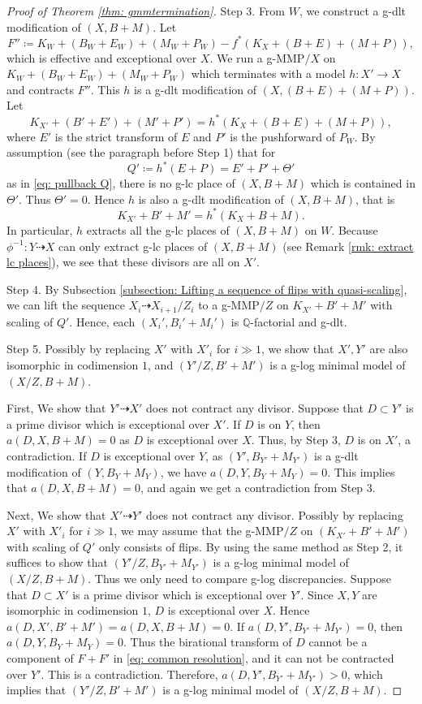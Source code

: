 \documentclass[11pt]{amsart}
\newcommand{\Qq}{\mathbb{Q}}
\begin{document}
\begin{proof}[Proof of Theorem \ref{thm: gmmtermination}]
Step 3. From $W$, we construct a g-dlt modification of $(X, B+M)$. Let
	\[
	F'' \coloneqq K_W+(B_W+E_W)+(M_W+P_W) -f^*(K_{X}+(B+E)+(M+P)),
	\] which is effective and exceptional over $X$. We run a g-MMP$/X$ on $K_W+(B_W+E_W)+(M_W+P_W)$ which terminates with a model $h: X' \to X$ and contracts $F''$. This $h$ is a g-dlt modification of $(X, (B+E)+(M+P))$. Let
	\[
	K_{X'}+(B'+E')+(M'+P') =h^*(K_{X}+(B+E)+(M+P)),
	\]  
	where $E'$ is the strict transform of $E$ and $P'$ is the pushforward of $P_W$. By assumption (see the paragraph before Step 1) that for 
	\[
	Q'\coloneqq h^*(E+P)=E'+P'+\Theta'
	\] as in \eqref{eq: pullback Q}, there is no g-lc place of $({X}, B+M)$ which is contained in $\Theta'$. Thus $\Theta'=0$. Hence $h$ is also a g-dlt modification of $({X}, B+M)$, that is
	\[
	K_{X'}+B'+M' =h^*(K_{X}+B+M).
	\] In particular, $h$ extracts all the g-lc places of $(X, B+M)$ on $W$. Because $\phi^{-1}: Y \dashrightarrow X$ can only extract g-lc places of $(X,B+M)$ (see Remark \ref{rmk: extract lc places}), we see that these divisors are all on $X'$.
	
Step 4. By Subsection \ref{subsection: Lifting a sequence of flips with quasi-scaling}, we can lift the sequence $X_i\dashrightarrow X_{i+1}/Z_i$ to a g-MMP$/Z$ on $K_{X'}+B'+M'$ with scaling of $Q'$. Hence, each $({X_i'}, B_i'+M_i')$ is $\Qq$-factorial and g-dlt.

Step 5. Possibly by replacing $X'$ with $X'_i$ for $i\gg 1$, we show that $X', Y'$ are also isomorphic in codimension $1$, and $(Y'/Z,B'+M')$ is a g-log minimal model of $(X/Z,B+M)$.
	
	First, We show that $Y'\dashrightarrow X'$ does not contract any divisor. Suppose that $D\subset Y'$ is a prime divisor which is exceptional over $X'$. If $D$ is on $Y$, then $a(D,X,B+M)=0$ as $D$ is exceptional over $X$. Thus, by Step 3, $D$ is on $X'$, a contradiction. If $D$ is exceptional over $Y$, as $(Y',B_{Y'}+M_{Y'})$ is a g-dlt modification of $(Y, B_Y+M_Y)$, we have $a(D,Y,B_Y+M_Y)=0$. This implies that $a(D,X,B+M)=0$, and again we get a contradiction from Step 3. 
	
	Next, We show that $X' \dashrightarrow Y'$ does not contract any divisor. Possibly by replacing $X'$ with $X'_i$ for $i\gg 1$, we may assume that the g-MMP$/Z$ on $(K_{X'}+B'+M')$ with scaling of $Q'$ only consists of flips. By using the same method as Step 2, it suffices to show that $(Y'/Z,B_{Y'}+M_{Y'})$ is a g-log minimal model of $(X/Z,B+M)$. Thus we only need to compare g-log discrepancies. Suppose that $D\subset X'$ is a prime divisor which is exceptional over $Y'$. Since $X, Y$ are isomorphic in codimension $1$, $D$ is exceptional over $X$. Hence $a(D, X', B'+M')=a(D, X, B+M)=0$. If $a(D,Y',B_{Y'}+M_{Y'})=0$, then $a(D,Y,B_Y+M_Y)=0$. Thus the birational transform of $D$ cannot be a component of $F+F'$ in \eqref{eq: common resolution}, and it can not be contracted over $Y'$. This is a contradiction. Therefore, $a(D,Y',B_{Y'}+M_{Y'})>0$, which implies that 
	$(Y'/Z,B'+M')$ is a g-log minimal model of $(X/Z,B+M)$.


\end{proof}
\end{document}
